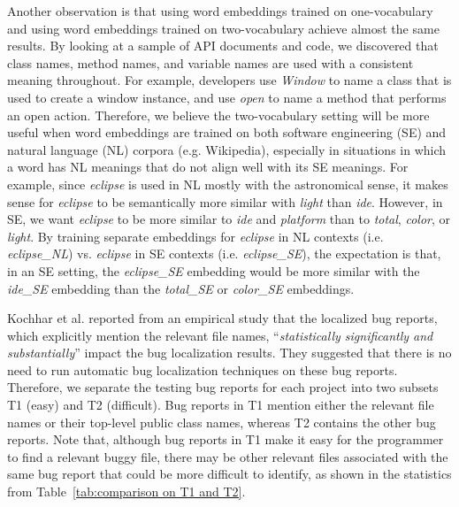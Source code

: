 Another observation is that using word embeddings trained on one-vocabulary and using word embeddings trained on two-vocabulary achieve almost the same results.
By looking at a sample of API documents and code, we discovered that class names, method names, and variable names are used with a consistent meaning throughout. For example, developers use \textit{Window} to name a class that is used to create a window instance, and use \textit{open} to name a method that performs an open action. Therefore, we believe the two-vocabulary setting will be more useful when word embeddings are trained on both software engineering (SE) and natural language (NL) corpora (e.g. Wikipedia), especially in situations in which a word has NL meanings that do not align well with its SE meanings. For example, since {\it eclipse} is used in NL mostly with the astronomical sense, it makes sense for {\it eclipse} to be semantically more similar with {\it light} than {\it ide}. However, in SE, we want {\it eclipse} to be more similar to {\it ide} and {\it platform} than to {\it total}, {\it color},  or {\it light}. By training separate embeddings for {\it eclipse} in NL contexts (i.e. {\it eclipse\_NL}) vs. {\it eclipse} in SE contexts (i.e. {\it eclipse\_SE}), the expectation is that, in an SE setting, the {\it eclipse\_SE} embedding would be more similar with the {\it ide\_SE} embedding than the {\it total\_SE} or {\it color\_SE} embeddings. 

Kochhar et al. \cite{Kochhar:2014:PBB:2642937.2642997} reported from an empirical study that the localized bug reports, which explicitly mention the relevant file names, ``{\it statistically significantly and substantially}'' impact the bug localization results. They suggested that there is no need to run automatic bug localization techniques on these bug reports. Therefore, we separate the testing bug reports for each project into two subsets T1 (easy) and T2 (difficult). Bug reports in T1 mention either the relevant file names or their top-level public class names, whereas T2 contains the other bug reports. Note that, although bug reports in T1 make it easy for the programmer to find a relevant buggy file, there may be other relevant files associated with the same bug report that could be more difficult to identify, as shown in the statistics from Table~\ref{tab:comparison on T1 and T2}.

